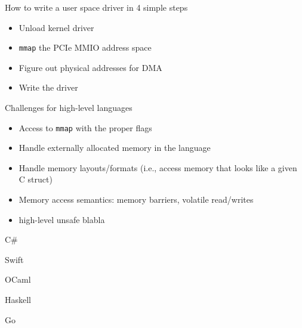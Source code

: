\documentclass[NET,english,aspectratio=169,notitleframe]{tumbeamer}
\begin{document}
\begin{frame}{How to write a user space driver in 4 simple steps}
\begin{itemize}
\item[1.] Unload kernel driver
\item[2.] \texttt{mmap} the PCIe MMIO address space
\item[3.] Figure out physical addresses for DMA
\item[4.] Write the driver
\end{itemize}
\end{frame}


\begin{frame}{Challenges for high-level languages}
\begin{itemize}
\item Access to \texttt{mmap} with the proper flags
\item Handle externally allocated memory in the language
\item Handle memory layouts/formats (i.e., access memory that looks like a given C struct)
\item Memory access semantics: memory barriers, volatile read/writes
\vspace{1em}
\pause
\item high-level unsafe blabla
\end{itemize}
\end{frame}



\begin{frame}{C\#}
\end{frame}

\begin{frame}{Swift}
\end{frame}

\begin{frame}{OCaml}
\end{frame}

\begin{frame}{Haskell}
\end{frame}

\begin{frame}{Go}
\end{frame}
\end{document}
